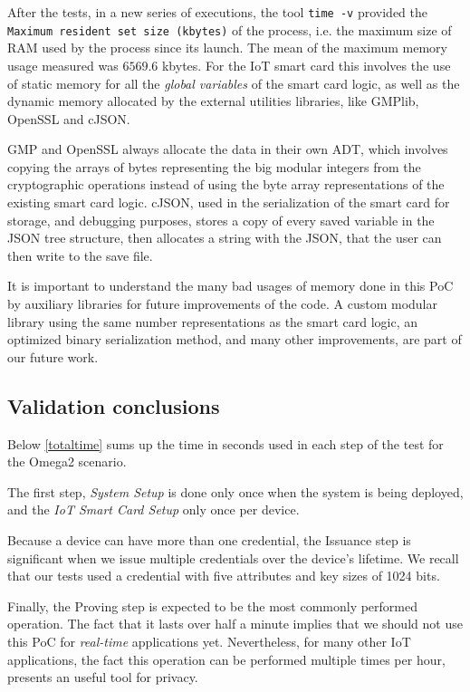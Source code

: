 After the tests, in a new series of executions, the tool \texttt{time -v} provided the \texttt{Maximum resident set size (kbytes)} of the process, i.e. the maximum size of RAM used by the process since its launch. The mean of the maximum memory usage measured was $6569.6$ kbytes. For the IoT smart card this involves the use of static memory for all the \textit{global variables} of the smart card logic, as well as the dynamic memory allocated by the external utilities libraries, like GMPlib, OpenSSL and cJSON.

GMP and OpenSSL always allocate the data in their own ADT, which involves copying the arrays of bytes representing the big modular integers from the cryptographic operations instead of using the byte array representations of the existing smart card logic. cJSON, used in the serialization of the smart card for storage, and debugging purposes, stores a copy of every saved variable in the JSON tree structure, then allocates a string with the JSON, that the user can then write to the save file.

It is important to understand the many bad usages of memory done in this PoC by auxiliary libraries for future improvements of the code. A custom modular library using the same number representations as the smart card logic, an optimized binary serialization method, and many other improvements, are part of our future work.


\subsection{Validation conclusions}

Below \autoref{totaltime} sums up the time in seconds used in each step of the test for the Omega2 scenario.

The first step, \textit{System Setup} is done only once when the system is being deployed, and the \textit{IoT Smart Card Setup} only once per device.

Because a device can have more than one credential, the Issuance step is significant when we issue multiple credentials over the device's lifetime. We recall that our tests used a credential with five attributes and key sizes of 1024 bits.

Finally, the Proving step is expected to be the most commonly performed operation. The fact that it lasts over half a minute implies that we should not use this PoC for \textit{real-time} applications yet. Nevertheless, for many other IoT applications, the fact this operation can be performed multiple times per hour, presents an useful tool for privacy.


